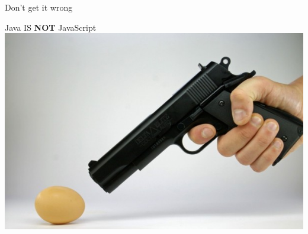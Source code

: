 \documentclass[English,c,%
hyperref={%
    pdftitle={FISA-DE2 OOP in Java},%
    pdfauthor={Muller, Gravier, Laforest, Subercaze},%
    pdfsubject={OOP in Java},%
    pdfkeywords={OOP, Java},%
    colorlinks=true,%
    urlcolor=blue,%
    linkcolor=%
    },%
xcolor={pdftex,svgnames} %
]{beamer}
\begin{document}
\begin{frame}{Don't get it wrong}
  \begin{center}
    Java IS \textbf{NOT} JavaScript \\[1.5em]
    \includegraphics[width=.8\linewidth,height=.6\textheight]{./images01/killegg.jpg}
  \end{center}
\end{frame}
\end{document}
